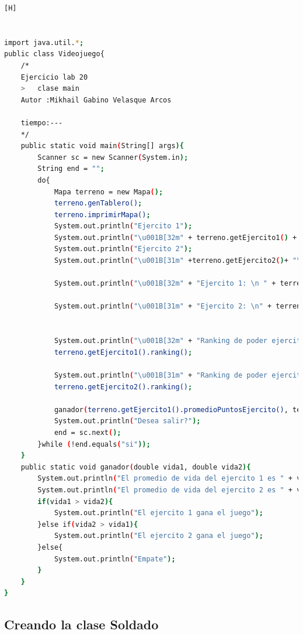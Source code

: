 \documentclass{article}
\begin{document}
	\begin{lstlisting}[language=bash,caption={CLASE MAIN o "ViDEOJUEGO"}][H]
	

import java.util.*;
public class Videojuego{
	/*
	Ejercicio lab 20 
	>	clase main 
	Autor :Mikhail Gabino Velasque Arcos

	tiempo:---
	*/
	public static void main(String[] args){
		Scanner sc = new Scanner(System.in);
		String end = "";
		do{
			Mapa terreno = new Mapa();
			terreno.genTablero();
			terreno.imprimirMapa();
			System.out.println("Ejercito 1");
			System.out.println("\u001B[32m" + terreno.getEjercito1() + "\u001B[0m");
			System.out.println("Ejercito 2");
			System.out.println("\u001B[31m" +terreno.getEjercito2()+ "\u001B[0m");

			System.out.println("\u001B[32m" + "Ejercito 1: \n " + terreno.getEjercito1().mayorVidaEjercito()+"\u001B[0m");

			System.out.println("\u001B[31m" + "Ejercito 2: \n" + terreno.getEjercito2().mayorVidaEjercito()+"\u001B[0m");


			System.out.println("\u001B[32m" + "Ranking de poder ejercito 1"+"\u001B[0m");
			terreno.getEjercito1().ranking();

			System.out.println("\u001B[31m" + "Ranking de poder ejercito 2"+"\u001B[0m");
			terreno.getEjercito2().ranking();
			
			ganador(terreno.getEjercito1().promedioPuntosEjercito(), terreno.getEjercito2().promedioPuntosEjercito());
			System.out.println("Desea salir?");
			end = sc.next();
		}while (!end.equals("si"));
	}
	public static void ganador(double vida1, double vida2){
		System.out.println("El promedio de vida del ejercito 1 es " + vida1);
		System.out.println("El promedio de vida del ejercito 2 es " + vida2);
		if(vida1 > vida2){
			System.out.println("El ejercito 1 gana el juego");
		}else if(vida2 > vida1){
			System.out.println("El ejercito 2 gana el juego");
		}else{
			System.out.println("Empate");
		}
	}
}
	\end{lstlisting}	
	
	
	\subsection{Creando la clase Soldado}
		
\end{document}
